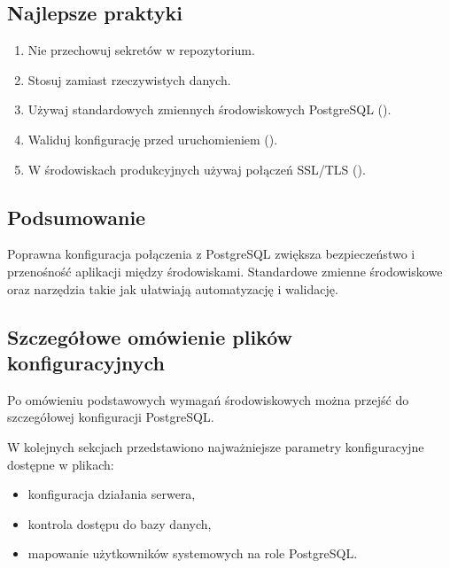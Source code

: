 \documentclass[a4paper,11pt,english,openany,oneside]{sphinxmanual}
\begin{document}
\subsection{Najlepsze praktyki}
\label{\detokenize{rozdzial_2/rozdzial_22/index:najlepsze-praktyki}}\begin{enumerate}
%
\item {} 
\sphinxAtStartPar
Nie przechowuj sekretów w repozytorium.

\item {} 
\sphinxAtStartPar
Stosuj  zamiast rzeczywistych danych.

\item {} 
\sphinxAtStartPar
Używaj standardowych zmiennych środowiskowych PostgreSQL ().

\item {} 
\sphinxAtStartPar
Waliduj konfigurację przed uruchomieniem ().

\item {} 
\sphinxAtStartPar
W środowiskach produkcyjnych używaj połączeń SSL/TLS ().

\end{enumerate}


\subsection{Podsumowanie}
\label{\detokenize{rozdzial_2/rozdzial_22/index:podsumowanie}}
\sphinxAtStartPar
Poprawna konfiguracja połączenia z PostgreSQL zwiększa bezpieczeństwo i przenośność aplikacji między środowiskami. Standardowe zmienne środowiskowe oraz narzędzia takie jak  ułatwiają automatyzację i walidację.


\subsection{Szczegółowe omówienie plików konfiguracyjnych}
\label{\detokenize{rozdzial_2/rozdzial_22/index:szczegolowe-omowienie-plikow-konfiguracyjnych}}
\sphinxAtStartPar
Po omówieniu podstawowych wymagań środowiskowych można przejść do szczegółowej konfiguracji PostgreSQL.

\sphinxAtStartPar
W kolejnych sekcjach przedstawiono najważniejsze parametry konfiguracyjne dostępne w plikach:
\begin{itemize}
\item {} 
\sphinxAtStartPar
{} \textendash{} konfiguracja działania serwera,

\item {} 
\sphinxAtStartPar
{} \textendash{} kontrola dostępu do bazy danych,

\item {} 
\sphinxAtStartPar
{} \textendash{} mapowanie użytkowników systemowych na role PostgreSQL.

\end{itemize}
\end{document}
